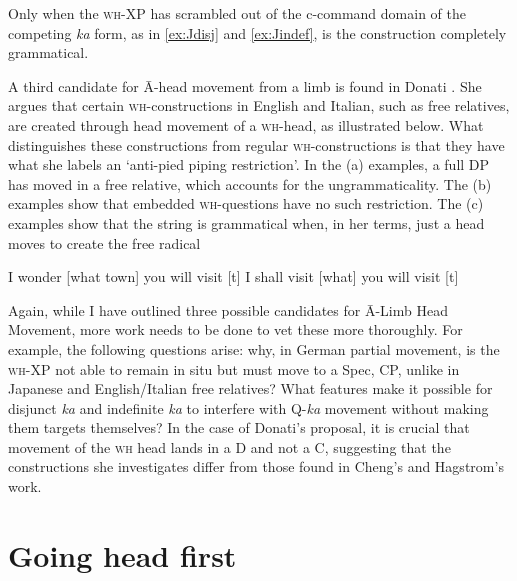 \documentclass[output=paper,colorlinks,citecolor=brown,
]{langscibook}
\begin{document}
Only when the \textsc{wh}-XP has scrambled out of the c-command domain of the competing \textit{ka} form, as in \ref{ex:Jdisj} and \ref{ex:Jindef}, is the construction completely grammatical.

A third candidate for \=A-head movement from a limb is found in Donati \citeyearpar{Donati:2006}.  She argues that certain \textsc{wh}-constructions in English and Italian, such as free relatives, are created through head movement of a \textsc{wh}-head, as illustrated below.  What distinguishes these constructions from regular \textsc{wh}-constructions is that they have what she labels an `anti-pied piping restriction'.  In the (a) examples, a full DP has moved in a free relative, which accounts for the ungrammaticality.  The (b) examples show that embedded \textsc{wh}-questions have no such restriction. The (c) examples show that the string is grammatical when, in her terms, just a head moves to create the free radical

\ea 
{}
\z
\z

\ea 
    \ex I wonder [what town] you will visit [t]
    \ex I shall visit [what] you will visit [t]
    \z
\z

Again, while I have outlined three possible candidates for \=A-Limb Head Movement, more work needs to be done to vet these more thoroughly.  For example, the following questions arise: why, in German partial movement, is the \textsc{wh}-XP not able to remain in situ but must move to a Spec, CP, unlike in Japanese and English/Italian free relatives? What features make it possible for disjunct \textit{ka} and indefinite \textit{ka} to interfere with Q-\textit{ka} movement without making them targets themselves?  In the case of Donati's proposal, it is crucial that movement of the \textsc{wh} head lands in a D and not a C, suggesting that the constructions she investigates differ from those found in Cheng's and Hagstrom's work.

\section{Going head first}
\end{document}
